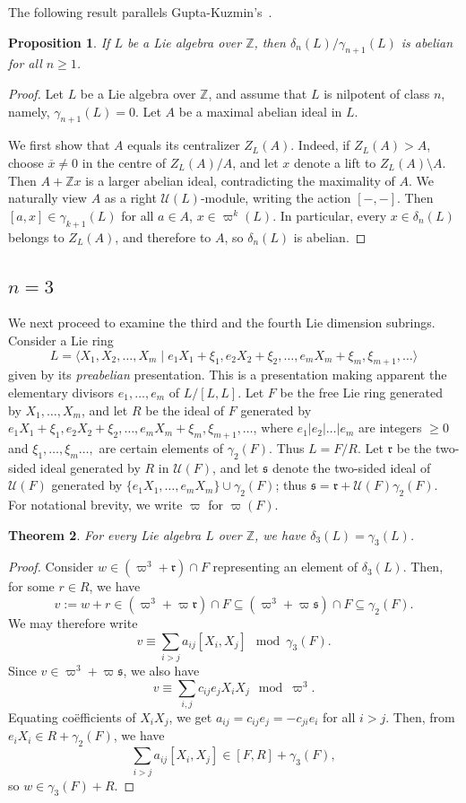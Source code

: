 \documentclass[a4paper,reqno,notitlepage]{amsart}
\newtheorem{theorem}{Theorem}[section]
\newtheorem{prop}[theorem]{Proposition}
\theoremstyle{definition}
\newcommand{\Z}{\mathbb Z}
\newcommand\rr{{\mathfrak r}}
\renewcommand\ss{{\mathfrak s}}
\newcommand\U{\mathscr U}
\begin{document}
\noindent The following result parallels
Gupta-Kuzmin's~\cite{Gupta-Kuzmin:92}.
\begin{prop}
  If $L$ be a Lie algebra over $\Z$, then
  $\delta_n(L)/\gamma_{n+1}(L)$ is abelian for all $n\ge1$.
\end{prop}
\begin{proof}
  Let $L$ be a Lie algebra over $\Z$, and assume that $L$ is nilpotent
  of class $n$, namely, $\gamma_{n+1}(L)=0$. Let $A$ be a maximal
  abelian ideal in $L$.

  We first show that $A$ equals its centralizer $Z_L(A)$. Indeed, if
  $Z_L(A)>A$, choose $\overline x\neq0$ in the centre of $Z_L(A)/A$,
  and let $x$ denote a lift to $Z_L(A)\setminus A$. Then $A+\Z x$ is a
  larger abelian ideal, contradicting the maximality of $A$. We
  naturally view $A$ as a right $\U(L)$-module, writing the action
  $[-,-]$. Then $[a,x]\in\gamma_{k+1}(L)$ for all $a\in A$,
  $x\in\varpi^k(L)$. In particular, every $x\in\delta_n(L)$ belongs to
  $Z_L(A)$, and therefore to $A$, so $\delta_n(L)$ is abelian.
\end{proof}

\subsection{\boldmath $n=3$}
We next proceed to examine the third and the fourth Lie dimension
subrings. Consider a Lie ring
\[L=\langle X_1,X_2,\ldots,X_m\mid e_1X_1+\xi_1,e_2X_2+\xi_2,\ldots,e_mX_m+\xi_m,\xi_{m+1},\ldots\rangle
\]
given by its \emph{preabelian} presentation. This is a presentation
making apparent the elementary divisors $e_1,\dots,e_m$ of $L/[L,L]$. Let $F$
be the free Lie ring generated by $X_1,\ldots,X_m$, and let $R$ be the
ideal of $F$ generated by
$e_1X_1+\xi_1,e_2X_2+\xi_2,\ldots,e_mX_m+\xi_m,\xi_{m+1},\ldots$,
where $e_1|e_2|\ldots|e_m$ are integers $\geq 0$ and
$\xi_1,\ldots,\xi_m\ldots,$ are certain elements of
$\gamma_2(F)$. Thus $L=F/R$. Let $\rr$ be the two-sided ideal
generated by $R$ in $\U(F)$, and let $\ss$ denote the two-sided ideal
of $\U(F)$ generated by $\{e_1X_1,\ldots,e_mX_m\}\cup\gamma_2(F)$;
thus $\ss=\rr+\U(F)\gamma_2(F)$. For notational brevity, we write
$\varpi$ for $\varpi(F)$.

\begin{theorem}\label{thm:delta3}
  For every Lie algebra $L$ over $\Z$, we have
  $\delta_3(L)=\gamma_3(L)$.
\end{theorem}
\begin{proof}
  Consider $w\in(\varpi^3+\mathfrak r)\cap F$ representing an element
  of $\delta_3(L)$. Then, for some $r\in R$, we have
  \[v:=w+r\in(\varpi^3+\varpi\rr)\cap F\subseteq(\varpi^3+\varpi\ss)\cap F\subseteq\gamma_2(F).
  \]
  We may therefore write
  \[v\equiv\sum_{i>j} a_{ij}[X_i,X_j]\mod \gamma_3(F).\]
  Since $v\in\varpi^3+\varpi\ss$, we also have
  \[v\equiv\sum_{i,j}c_{ij}e_jX_iX_j\mod \varpi^3.
  \]
  Equating co\"efficients of $X_iX_j$, we get
  $a_{ij}=c_{ij}e_j=-c_{ji}e_i$ for all $i>j$. Then, from $e_iX_i\in
  R+\gamma_2(F)$, we have
  \[\sum_{i>j}a_{ij}[X_i,X_j]\in [F,R]+\gamma_3(F),\]
  so $w\in \gamma_3(F)+R$.
\end{proof}
\end{document}
